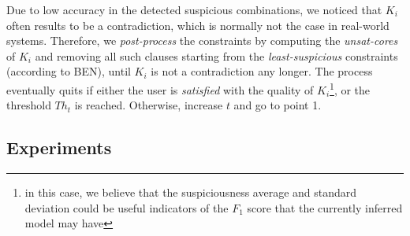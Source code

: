 \begin{tikzborder}{\cite{Gargantini16:validation}}
\begin{tikzborder}{\cite{gargantini_combinatorial_2017}}
\begin{tikzborder}{\cite{garn2019}}
\begin{inparaenum}
Due to low accuracy in the detected suspicious combinations, 
we noticed that $K_i$ often results to be a contradiction, which is normally not the case in real-world systems.%
Therefore, we \textit{post-process} the constraints by computing the \textit{unsat-cores} of $K_i$ and removing all such clauses starting from the \textit{least-suspicious} constraints (according to BEN), until
$K_i$ is not a contradiction any longer.
The process eventually quits if either the user is \textit{satisfied} with the quality of $K_i$\footnote{in this case, we believe that the suspiciousness average and standard deviation could be useful indicators of the $F_1$ score that the currently inferred model may have}, or the threshold $Th_t$ is reached.
Otherwise, increase $t$ and go to point 1.
\end{inparaenum}
\be

\subsection{Experiments}\label{sec:xssexperiments}


\end{tikzborder}
\end{tikzborder}
\end{tikzborder}
